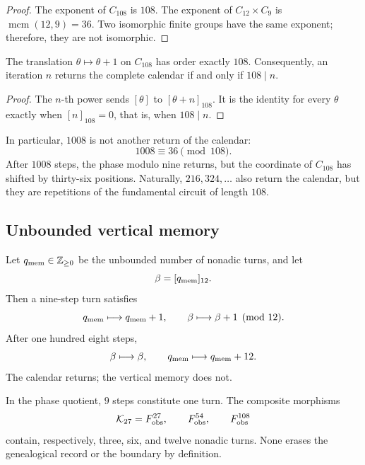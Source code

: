 \begin{proof}
The exponent of \(C_{108}\) is \(108\). The exponent of
\(C_{12}\times C_9\) is
\(\operatorname{mcm}(12,9)=36\). Two isomorphic finite groups have the
same exponent; therefore, they are not isomorphic.
\end{proof}

\begin{theorem}
\label{p12-83-c1-s13:thm:tpk-periodo-exacto-108}
The translation \(\theta\mapsto\theta+1\) on \(C_{108}\) has order
exactly \(108\). Consequently, an iteration \(n\) returns the
complete calendar if and only if \(108\mid n\).
\end{theorem}

\begin{proof}
The \(n\)-th power sends \([\theta]\) to \([\theta+n]_{108}\). It is
the identity for every \(\theta\) exactly when \([n]_{108}=0\), that is,
when \(108\mid n\).
\end{proof}

In particular, \(1008\) is not another return of the calendar:
\[
 1008\equiv36\pmod{108}.
\]
After \(1008\) steps, the phase modulo nine returns, but the coordinate of
\(C_{108}\) has shifted by thirty-six positions. Naturally,
\(216,324,\ldots\) also return the calendar, but they are repetitions of
the fundamental circuit of length \(108\).

\subsection{Unbounded vertical memory}

Let \(q_{\rm mem}\in\mathbb Z_{\geq0}\) be the unbounded number of nonadic
turns, and let
\[
 \beta=[q_{\rm mem}]_{12}.
\]
Then a nine-step turn satisfies
\[
 q_{\rm mem}\longmapsto q_{\rm mem}+1,
 \qquad
 \beta\longmapsto\beta+1\pmod{12}.
\]
After one hundred eight steps,
\[
 \beta\longmapsto\beta,
 \qquad
 q_{\rm mem}\longmapsto q_{\rm mem}+12.
\]
The calendar returns; the vertical memory does not.

\begin{corollary}
\label{p12-83-c1-s13:cor:tpk-jerarquia-retornos}
In the phase quotient,
\(9\) steps constitute one turn. The composite morphisms
\[
 \mathcal K_{27}=F_{\rm obs}^{27},
 \qquad
 F_{\rm obs}^{54},
 \qquad
 F_{\rm obs}^{108}
\]
contain, respectively, three, six, and twelve nonadic turns. None
erases the genealogical record or the boundary by definition.
\end{corollary}

